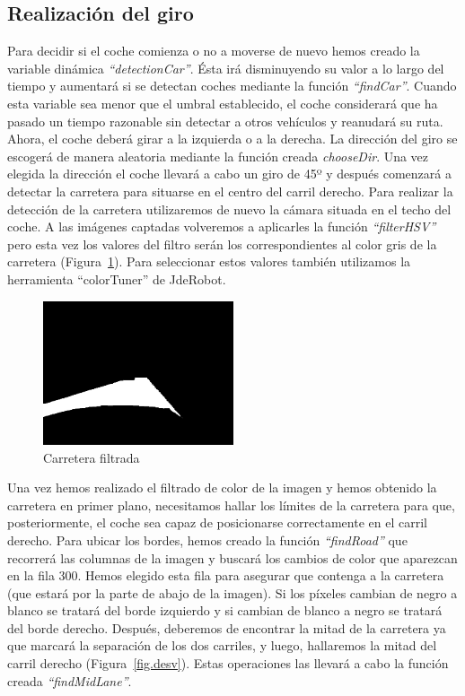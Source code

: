 \subsection{Realización del giro}
Para decidir si el coche comienza o no a moverse de nuevo hemos creado la variable dinámica \textit{``detectionCar''}. Ésta irá disminuyendo su valor a lo largo del tiempo y aumentará si se detectan coches mediante la función \textit{``findCar''}. Cuando esta variable sea menor que el umbral establecido, el coche considerará que ha pasado un tiempo razonable sin detectar a otros vehículos y reanudará su ruta. \\

Ahora, el coche deberá girar a la izquierda o a la derecha. La dirección del giro se escogerá de manera aleatoria mediante la función creada \textit{chooseDir}. Una vez elegida la dirección el coche llevará a cabo un giro de 45º y después comenzará a detectar la carretera para situarse en el centro del carril derecho. Para realizar la detección de la carretera utilizaremos de nuevo la cámara situada en el techo del coche. A las imágenes captadas volveremos a aplicarles la función \textit{``filterHSV''} pero esta vez los valores del filtro serán los correspondientes al color gris de la carretera (Figura~\ref{fig.road}). Para seleccionar estos valores también utilizamos la herramienta ``colorTuner'' de JdeRobot.\\

\begin{figure}[H]
  \begin{center}
    \includegraphics[width=0.5\textwidth]{figures/Stop/road.jpg}
		\caption{Carretera filtrada}
		\label{fig.road}
		\end{center}
\end{figure}

Una vez hemos realizado el filtrado de color de la imagen y hemos obtenido la carretera en primer plano, necesitamos hallar los límites de la carretera para que, posteriormente, el coche sea capaz de posicionarse correctamente en el carril derecho. Para ubicar los bordes, hemos creado la función \textit{``findRoad''} que recorrerá las columnas de la imagen y buscará los cambios de color que aparezcan en la fila 300. Hemos elegido esta fila para asegurar que contenga a la carretera (que estará por la parte de abajo de la imagen). Si los píxeles cambian de negro a blanco se tratará del borde izquierdo y si cambian de blanco a negro se tratará del borde derecho. Después, deberemos de encontrar la mitad de la carretera ya que marcará la separación de los dos carriles, y luego, hallaremos la mitad del carril derecho (Figura~\ref{fig.desv}). Estas operaciones las llevará a cabo la función creada \textit{``findMidLane''}. \\


